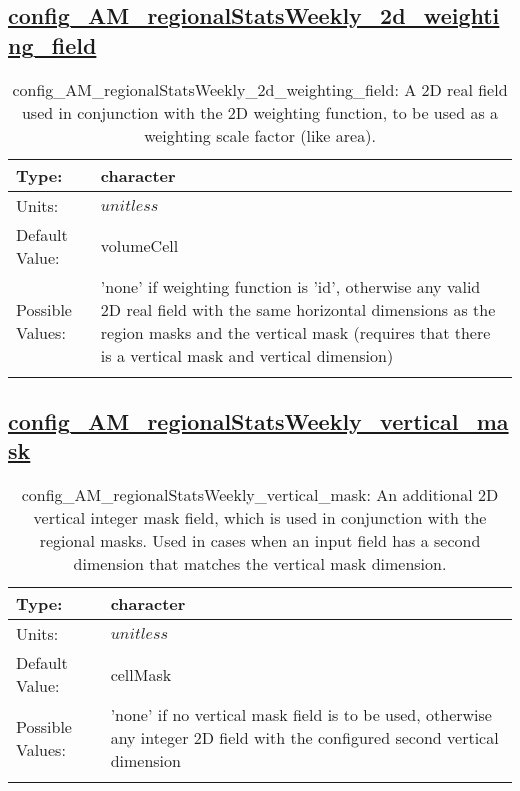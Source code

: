\subsection[config\_AM\_regionalStatsWeekly\_2d\_weighting\_field]{\hyperref[sec:nm_tab_AM_regionalStatsWeekly]{config\_AM\_regionalStatsWeekly\_2d\_weighting\_field}}
\label{subsec:nm_sec_config_AM_regionalStatsWeekly_2d_weighting_field}
\begin{center}
\begin{longtable}{| p{2.0in} || p{4.0in} |}
    \hline
    Type: & character \\
    \hline
    Units: & $unitless$ \\
    \hline
    Default Value: & volumeCell \\
    \hline
    Possible Values: & 'none' if weighting function is 'id', otherwise any valid 2D real field with the same horizontal dimensions as the region masks and the vertical mask (requires that there is a vertical mask and vertical dimension) \\
    \hline
    \caption{config\_AM\_regionalStatsWeekly\_2d\_weighting\_field: A 2D real field used in conjunction with the 2D weighting function, to be used as a weighting scale factor (like area).}
\end{longtable}
\end{center}
\subsection[config\_AM\_regionalStatsWeekly\_vertical\_mask]{\hyperref[sec:nm_tab_AM_regionalStatsWeekly]{config\_AM\_regionalStatsWeekly\_vertical\_mask}}
\label{subsec:nm_sec_config_AM_regionalStatsWeekly_vertical_mask}
\begin{center}
\begin{longtable}{| p{2.0in} || p{4.0in} |}
    \hline
    Type: & character \\
    \hline
    Units: & $unitless$ \\
    \hline
    Default Value: & cellMask \\
    \hline
    Possible Values: & 'none' if no vertical mask field is to be used, otherwise any integer 2D field with the configured second vertical dimension \\
    \hline
    \caption{config\_AM\_regionalStatsWeekly\_vertical\_mask: An additional 2D vertical integer mask field, which is used in conjunction with the regional masks. Used in cases when an input field has a second dimension that matches the vertical mask dimension.}
\end{longtable}
\end{center}
